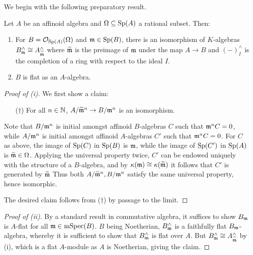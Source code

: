 We begin with the following preparatory result. 
\begin{proposition}\label{prop: flatness of section algebras}
    Let $A$ be an affinoid algebra and $\Omega\subseteq\mathrm{Sp}(A)$ a rational subset. Then:
    \begin{enumerate}[label=(\roman*)]
        \item For $B=\mathcal{O}_{\mathrm{Sp}(A)}(\Omega)$ and $\mathfrak{m}\in\mathrm{Sp}(B)$, there is an isomorphism of $K$-algebras $B_{\mathfrak{m}}^{\wedge}\cong A_{\widetilde{\mathfrak{m}}}^{\wedge}$ where $\widetilde{\mathfrak{m}}$ is the preimage of $\mathfrak{m}$ under the map $A\to B$ and $(-)^{\wedge}_{I}$ is the completion of a ring with respect to the ideal $I$. 
        \item $B$ is flat as an $A$-algebra. 
    \end{enumerate}
\end{proposition}
\begin{proof}[Proof of (i)]
    We first show a claim:
    \begin{itemize}
        \item [($\dagger$)] For all $n\in\mathbb{N}$, $A/\widetilde{\mathfrak{m}}^{n}\to B/\mathfrak{m}^{n}$ is an isomorphism. 
    \end{itemize}
    Note that $B/\mathfrak{m}^{n}$ is initial amongst affinoid $B$-algebras $C$ such that $\mathfrak{m}^{n}C=0$, while $A/\mathfrak{m}^{n}$ is initial amongst affinoid $A$-algebras $C'$ such that $\mathfrak{m}^{n}C=0$. For $C$ as above, the image of $\mathrm{Sp}(C)$ in $\mathrm{Sp}(B)$ is $\mathfrak{m}$, while the image of $\mathrm{Sp}(C')$ in $\mathrm{Sp}(A)$ is $\widetilde{\mathfrak{m}}\in\Omega$. Applying the universal property twice, $C'$ can be endowed uniquely with the structure of a $B$-algebra, and by $\kappa(\mathfrak{m})\cong\kappa(\widetilde{\mathfrak{m}})$ it follows that $C'$ is generated by $\widetilde{\mathfrak{m}}$ Thus both $A/\widetilde{\mathfrak{m}}^{n}, B/\mathfrak{m}^{n}$ satisfy the same universal property, hence isomorphic. 

    The desired claim follows from ($\dagger$) by passage to the limit. 
\end{proof}
\begin{proof}[Proof of (ii)]
    By a standard result in commutative algebra, it suffices to show $B_{\mathfrak{m}}$ is $A$-flat for all $\mathfrak{m}\in\mathrm{mSpec}(B)$. $B$ being Noetherian, $B^{\wedge}_{\mathfrak{m}}$ is a faithfully flat $B_{\mathfrak{m}}$-algebra, whereby it is sufficient to show that $B^{\wedge}_{\mathfrak{m}}$ is flat over $A$. But $B^{\wedge}_{\mathfrak{m}}\cong A^{\wedge}_{\widetilde{\mathfrak{m}}}$ by (i), which is a flat $A$-module as $A$ is Noetherian, giving the claim. 
\end{proof}

